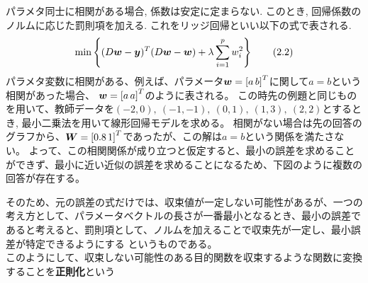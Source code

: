 パラメタ同士に相関がある場合, 係数は安定に定まらない. このとき, 回帰係数のノルムに応じた罰則項を加える. これをリッジ回帰といい以下の式で表される.
\begin{align*}
    {\rm min}\left\{ (D\mbox{\boldmath $w$}-\mbox{\boldmath $y$})^{T}(D\mbox{\boldmath $w$}-\mbox{\boldmath $w$})+\lambda \sum_{i=1}^{p}w_{i}^{2}\right\} \tag{2.2}
\end{align*}
パラメタ変数に相関がある、例えば、パラメータ$\mbox{\boldmath $w$}=\left[a \, b\right]^{T}$に関して$a=b$という相関があった場合、
$\mbox{\boldmath $w$}=\left[a\,a\right]^{T}$のように表される。
この時先の例題と同じものを用いて、教師データを$(-2,0),\ (-1,-1),\ (0,1),\ (1,3),\ (2,2)$とするとき, 最小二乗法を用いて線形回帰モデルを求める。
相関がない場合は先の回答のグラフから、$\mbox{\boldmath $W$}=\left[0.8\, 1\right]^{T}$であったが、この解は$a=b$という関係を満たさない。
よって、この相関関係が成り立つと仮定すると、最小の誤差を求めることができず、最小に近い近似の誤差を求めることになるため、下図のように複数の回答が存在する。
\begin{center}
\end{center}
そのため、元の誤差の式だけでは、収束値が一定しない可能性があるが、一つの考え方として、パラメータベクトルの長さが一番最小となるとき、最小の誤差であると考えると、罰則項として、ノルムを加えることで収束先が一定し、最小誤差が特定できるようにする
というものである。\\
このようにして、収束しない可能性のある目的関数を収束するような関数に変換することを{\bf 正則化}という
